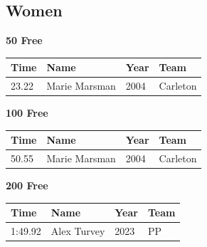 \subsection{Women}
\vspace{1.2em}
\noindent\begin{minipage}[t]{0.98\textwidth}
\centering
\textbf{\textcolor{teamprimary}{50 Free}}\par
\vspace{0.5em}
\centering
\small
\renewcommand{\arraystretch}{1.0}
\setlength{\tabcolsep}{4pt}
\begin{tabular}{@{}p{2.5cm}p{4.5cm}p{1.5cm}p{2.5cm}@{}}
\toprule
\textbf{Time} & \textbf{Name} & \textbf{Year} & \textbf{Team} \\
\midrule
23.22 & Marie Marsman & 2004 & Carleton \\
\bottomrule
\end{tabular}
\end{minipage}
\vspace{1.2em}
\noindent\begin{minipage}[t]{0.98\textwidth}
\centering
\textbf{\textcolor{teamprimary}{100 Free}}\par
\vspace{0.5em}
\centering
\small
\renewcommand{\arraystretch}{1.0}
\setlength{\tabcolsep}{4pt}
\begin{tabular}{@{}p{2.5cm}p{4.5cm}p{1.5cm}p{2.5cm}@{}}
\toprule
\textbf{Time} & \textbf{Name} & \textbf{Year} & \textbf{Team} \\
\midrule
50.55 & Marie Marsman & 2004 & Carleton \\
\bottomrule
\end{tabular}
\end{minipage}
\vspace{1.2em}
\noindent\begin{minipage}[t]{0.98\textwidth}
\centering
\textbf{\textcolor{teamprimary}{200 Free}}\par
\vspace{0.5em}
\centering
\small
\renewcommand{\arraystretch}{1.0}
\setlength{\tabcolsep}{4pt}
\begin{tabular}{@{}p{2.5cm}p{4.5cm}p{1.5cm}p{2.5cm}@{}}
\toprule
\textbf{Time} & \textbf{Name} & \textbf{Year} & \textbf{Team} \\
\midrule
1:49.92 & Alex Turvey & 2023 & PP \\
\bottomrule
\end{tabular}
\end{minipage}
\vspace{1.2em}
